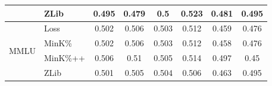 \begin{table}[h]
\begin{tabular}{clcccccc}
                                     & ZLib                                                        &   0.495       &   0.479      &  0.5       &   0.523       &   0.481       &  0.495           \\ \midrule
\multirow{4}{*}{MMLU}                & Loss                                                        &   0.502       &   0.506      &  0.503       &   0.512       &   0.459       &  0.476           \\  
                                     & MinK\%                                                      &   0.502       &   0.506      &  0.503       &   0.512       &   0.458       &  0.476           \\  
                                     & MinK\%++                                                    &   0.506       &   0.51      &  0.505       &   0.514       &   0.497       &  0.45           \\  
                                     & ZLib                                                        &   0.501       &   0.505      &  0.504       &   0.506       &   0.463       &  0.495           \\ \bottomrule
\end{tabular}
\end{table}